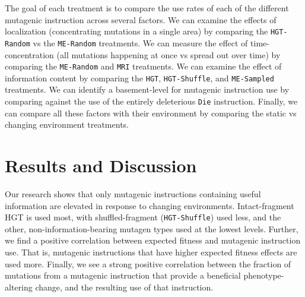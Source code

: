 \documentclass[PhD]{msu-thesis}
\begin{document}
The goal of each treatment is to compare the use rates of each of the different mutagenic instruction across several factors. We can examine the effects of localization (concentrating mutations in a single area) by comparing the \texttt{HGT-Random} vs the \texttt{ME-Random} treatments. We can measure the effect of time-concentration (all mutations happening at once vs spread out over time) by comparing the \texttt{ME-Random} and \texttt{MRI} treatments. We can examine the effect of information content by comparing the \texttt{HGT}, \texttt{HGT-Shuffle}, and \texttt{ME-Sampled} treatments. We can identify a basement-level for mutagenic instruction use by comparing against the use of the entirely deleterious \texttt{Die} instruction.  Finally, we can compare all these factors with their environment by comparing the static vs changing environment treatments.

\section{Results and Discussion}
Our research shows that only mutagenic instructions containing useful information are elevated in response to changing environments. Intact-fragment HGT is used most, with shuffled-fragment (\texttt{HGT-Shuffle}) used less, and the other, non-information-bearing mutagen types used at the lowest levels.  Further, we find a positive correlation between expected fitness and mutagenic instruction use. That is, mutagenic instructions that have higher expected fitness effects are used more. Finally, we see a strong positive correlation between the fraction of mutations from a mutagenic instruction that provide a beneficial phenotype-altering change, and the resulting use of that instruction.
\end{document}
